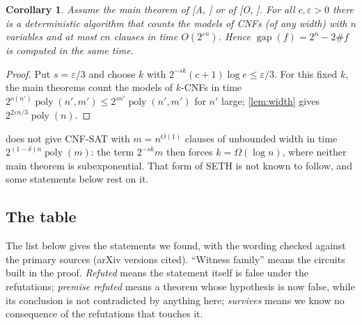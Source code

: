 \documentclass[10pt]{amsart}
\theoremstyle{plain}
\newtheorem{corollary}[theorem]{Corollary}
\theoremstyle{definition}
\theoremstyle{remark}
\numberwithin{equation}{section}
\newcommand{\poly}{\operatorname{poly}}
\newcommand{\gap}{\operatorname{gap}}
\newcommand{\A}[1][]{\textup{[A\if\relax\detokenize{#1}\relax\else, #1\fi]}}
\newcommand{\Oa}[1][]{\textup{[O\if\relax\detokenize{#1}\relax\else, #1\fi]}}
\begin{document}
\begin{corollary}\label{cor:density}
Assume the main theorem of \A{} or of \Oa. For all $c,\varepsilon>0$ there is a deterministic
algorithm that counts the models of CNFs (of any width) with $n$ variables and at most $cn$ clauses
in time $O(2^{\varepsilon n})$. Hence $\gap(f)=2^n-2\#f$ is computed in the same time.
\end{corollary}

\begin{proof}
Put $s=\varepsilon/3$ and choose $k$ with $2^{-sk}(c+1)\log e\le\varepsilon/3$. For this fixed
$k$, the main theorems count the models of $k$-CNFs in time $2^{o(n')}\poly(n',m')\le2^{sn'}\poly(n',m')$
for $n'$ large; \cref{lem:width} gives $2^{2\varepsilon n/3}\poly(n)$.
\end{proof}

 does not give CNF-SAT with $m=n^{O(1)}$ clauses of unbounded width in time
$2^{(1-\delta)n}\poly(m)$: the term $2^{-sk}m$ then forces $k=\Omega(\log n)$, where neither main
theorem is subexponential. That form of SETH is not known to follow, and some statements below
rest on it.

\subsection{The table}
The list below gives the statements we found, with the wording checked against the primary
sources (arXiv versions cited). ``Witness family'' means the circuits built in the proof.
\emph{Refuted} means the statement itself is false under the refutations; \emph{premise refuted}
means a theorem whose hypothesis is now false, while its conclusion is not contradicted by
anything here; \emph{survives} means we know no consequence of the refutations that touches it.
\end{document}

